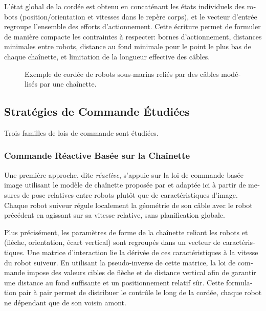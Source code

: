 \begin{otherlanguage}{french}
	L'état global de la cordée est obtenu en concaténant les états individuels des robots
	(position/orientation et vitesses dans le repère corps), et le vecteur d'entrée regroupe l'ensemble
	des efforts d'actionnement. Cette écriture permet de formuler de manière compacte les contraintes à
	respecter: bornes d'actionnement, distances minimales entre robots, distance au fond minimale pour
	le point le plus bas de chaque chaînette, et limitation de la longueur effective des câbles.

	\begin{figure}
		\centering
		\caption{
			Exemple de cordée de robots sous-marins reliés par des câbles modélisés par une chaînette.
		}
	\end{figure}

	\subsection{Stratégies de Commande Étudiées}
	\label{sif_rcc_controllers}

	Trois familles de lois de commande sont étudiées.

	\subsubsection{Commande Réactive Basée sur la Chaînette}

	Une première approche, dite \emph{réactive}, s'appuie sur la loi de commande basée image utilisant
	le modèle de chaînette proposée par \textcite{laranjeiraCatenarybasedVisualServoing2017} et adaptée
	ici à partir de mesures de pose relatives entre robots plutôt que de caractéristiques d'image.
	Chaque robot suiveur régule localement la géométrie de son câble avec le robot précédent en
	agissant sur sa vitesse relative, sans planification globale.

	Plus précisément, les paramètres de forme de la chaînette reliant les robots  et 
	(flèche, orientation, écart vertical) sont regroupés dans un vecteur de caractéristiques. Une
	matrice d'interaction lie la dérivée de ces caractéristiques à la vitesse du robot suiveur. En
	utilisant la pseudo-inverse de cette matrice, la loi de commande impose des valeurs cibles de
	flèche et de distance vertical afin de garantir une distance au fond suffisante et un
	positionnement relatif sûr. Cette formulation pair à pair permet de distribuer le contrôle le long
	de la cordée, chaque robot ne dépendant que de son voisin amont.


\end{otherlanguage}

